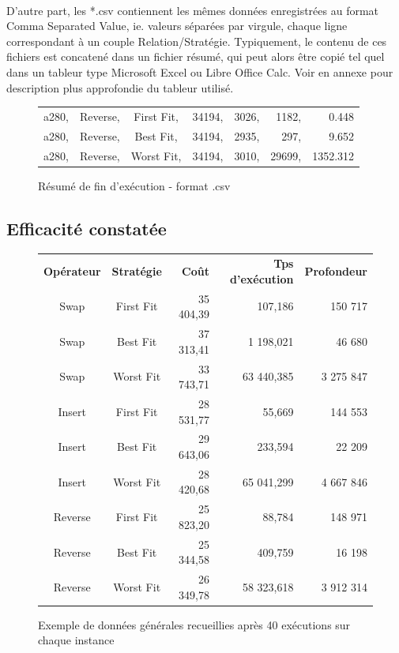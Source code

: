 \documentclass[a4paper,10pt]{report}
\begin{document}
\paragraph{}
  D'autre part, les *.csv contiennent les mêmes données enregistrées au format
Comma Separated Value, ie. valeurs séparées par virgule, chaque ligne
correspondant à un couple Relation/Stratégie. Typiquement, le contenu de ces 
fichiers est concatené dans un fichier résumé, qui peut alors être copié tel
quel dans un tableur type Microsoft Excel ou Libre Office Calc. Voir en annexe
pour description plus approfondie du tableur utilisé.

\begin{figure}[h]
  \begin{center}
    \begin{tabular}{cccrrrr}
      a280, &Reverse, &First Fit, &34194, &3026, &1182, &0.448\\
      a280, &Reverse, &Best Fit,  &34194, &2935, &297,  &9.652\\
      a280, &Reverse, &Worst Fit, &34194, &3010, &29699,&1352.312\\
    \end{tabular}
  \end{center}
  \label{a280-sample-csv}
  \caption{Résumé de fin d'exécution - format .csv}
\end{figure}

\subsection{Efficacité constatée}

\begin{figure}[h]
  \begin{center}
    \begin{tabular}{ccrrr}
      \textbf{Opérateur}& \textbf{Stratégie}& \textbf{Coût}& \textbf{Tps
d'exécution}& \textbf{Profondeur}\\
      Swap&	First Fit&	35 404,39&	107,186&	150 717\\
      Swap&	Best Fit&	37 313,41&	1 198,021&	46 680\\
      Swap&	Worst Fit&	33 743,71&	63 440,385&	3 275 847\\
      Insert&	First Fit&	28 531,77&	55,669&		144 553\\
      Insert&	Best Fit&	29 643,06&	233,594&	22 209\\
      Insert&	Worst Fit&	28 420,68&	65 041,299&	4 667 846\\
      Reverse&	First Fit&	25 823,20&	88,784&		148 971\\
      Reverse&	Best Fit&	25 344,58&	409,759&	16 198\\
      Reverse&	Worst Fit&	26 349,78&	58 323,618&	3 912 314\\
    \end{tabular}
  \end{center}
  \label{recap-general}
  \caption{Exemple de données générales recueillies après 40 exécutions sur
chaque instance}
\end{figure}
\end{document}
